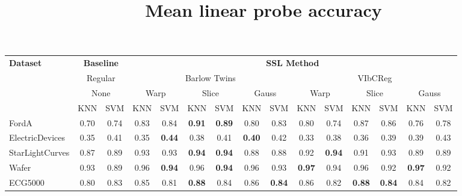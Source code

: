 \documentclass[../../thesis.tex]{subfiles}
\begin{document}
\begin{table}[H]
    \centering
    \title{Mean linear probe accuracy}
    \begin{adjustbox}{width=\textwidth}
    \begin{tabular}{lcc|cc|cc|cc|cc|cc|cc} %
        \toprule
        \multirow{4}{*}{\textbf{Dataset}} & \multicolumn{2}{c}{\textbf{Baseline}} & \multicolumn{12}{c}{\textbf{SSL Method}} \\
                                            \cmidrule(lr){2-3} \cmidrule(lr){4-15}
                                          & \multicolumn{2}{c}{Regular}           & \multicolumn{6}{c}{Barlow Twins}                                                 &  \multicolumn{6}{c}{VIbCReg} \\
                                          \cmidrule(lr){2-3} \cmidrule(lr){4-9} \cmidrule(lr){10-15}
                                          &   \multicolumn{2}{c}{None}            & \multicolumn{2}{c}{Warp}  & \multicolumn{2}{c}{Slice} & \multicolumn{2}{c}{Gauss} & \multicolumn{2}{c}{Warp} & \multicolumn{2}{c}{Slice} & \multicolumn{2}{c}{Gauss} \\
                                          \cmidrule(lr){2-3} \cmidrule(lr){4-5} \cmidrule(lr){6-7} \cmidrule(lr){8-9} \cmidrule(lr){10-11} \cmidrule(lr){12-13}\cmidrule(lr){14-15}
                                          & KNN & SVM                               & KNN & SVM                  & KNN & SVM                & KNN & SVM                 & KNN & SVM                 & KNN & SVM                 & KNN & SVM   \\
        \midrule
        FordA                   & 0.70 & 0.74 & 0.83 & 0.84 & \textbf{0.91} & \textbf{0.89} & 0.80 & 0.83 & 0.80 & 0.74 & 0.87 & 0.86 & 0.76 & 0.78 \\
        ElectricDevices         & 0.35 & 0.41 & 0.35 & \textbf{0.44} & 0.38 & 0.41 & \textbf{0.40} & 0.42 & 0.33 & 0.38 & 0.36 & 0.39 & 0.39 & 0.43 \\
        StarLightCurves         & 0.87 & 0.89 & 0.93 & 0.93 & \textbf{0.94} & \textbf{0.94} & 0.88 & 0.88 & 0.92 & \textbf{0.94} & 0.91 & 0.93 & 0.89 & 0.89 \\
        Wafer                   & 0.93 & 0.89 & 0.96 & \textbf{0.94} & 0.96 & \textbf{0.94} & 0.96 & 0.93 & \textbf{0.97} & 0.94 & 0.96 & 0.92 & \textbf{0.97} & 0.92 \\
        ECG5000                 & 0.80 & 0.83 & 0.85 & 0.81 & \textbf{0.88} & 0.84 & 0.86 & \textbf{0.84} & 0.86 & 0.82 & \textbf{0.88} & \textbf{0.84} & 0.84 & 0.82 \\

\end{tabular}
\end{adjustbox}
\end{table}
\end{document}
